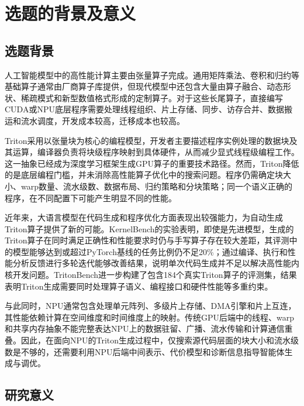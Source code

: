\chapter{选题的背景及意义}

\section{选题背景}

人工智能模型中的高性能计算主要由张量算子完成。通用矩阵乘法、卷积和归约等基础算子通常由厂商算子库提供，但现代模型中还包含大量由算子融合、动态形状、稀疏模式和新型数值格式形成的定制算子。对于这些长尾算子，直接编写CUDA或NPU底层程序需要处理线程组织、片上存储、同步、访存合并、数据搬运和流水调度，开发成本较高，迁移成本也较高。

Triton采用以张量块为核心的编程模型，开发者主要描述程序实例处理的数据块及其运算，编译器负责将块级程序映射到具体硬件，从而减少显式线程级编程工作\citep{tillet2019triton}。这一抽象已经成为深度学习框架生成GPU算子的重要技术路径。然而，Triton降低的是底层编程门槛，并未消除高性能算子优化中的搜索问题。程序仍需确定块大小、warp数量、流水级数、数据布局、归约策略和分块策略；同一个语义正确的程序，在不同配置下可能产生明显不同的性能。

近年来，大语言模型在代码生成和程序优化方面表现出较强能力，为自动生成Triton算子提供了新的可能。KernelBench的实验表明，即使是先进模型，生成的Triton算子在同时满足正确性和性能要求时仍与手写算子存在较大差距，其评测中的模型能够达到或超过PyTorch基线的任务比例仍不足20\%；通过编译、执行和性能分析反馈进行多轮迭代能够改善结果，说明单次代码生成并不足以解决高性能内核开发问题\citep{ouyang2025kernelbench}。TritonBench进一步构建了包含184个真实Triton算子的评测集，结果表明Triton生成需要同时处理算子语义、编程接口和硬件性能等多重约束\citep{li2025tritonbench}。

与此同时，NPU通常包含处理单元阵列、多级片上存储、DMA引擎和片上互连，其性能依赖计算在空间维度和时间维度上的映射。传统GPU后端中的线程、warp和共享内存抽象不能完整表达NPU上的数据驻留、广播、流水传输和计算通信重叠。因此，在面向NPU的Triton生成过程中，仅搜索源代码层面的块大小和流水级数是不够的，还需要利用NPU后端中间表示、代价模型和诊断信息指导智能体生成与调优。

\section{研究意义}


